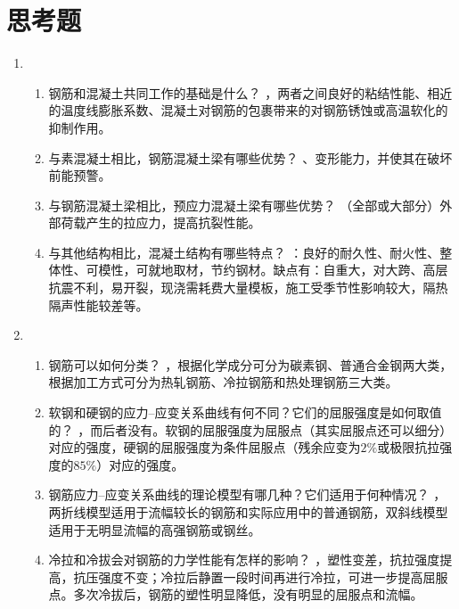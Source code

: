 \documentclass{article}
\begin{document}
\section{思考题}
\begin{enumerate}
    \item
          \begin{enumerate}[1.]
              \item 钢筋和混凝土共同工作的基础是什么？
                    ，两者之间良好的粘结性能、相近的温度线膨胀系数、混凝土对钢筋的包裹带来的对钢筋锈蚀或高温软化的抑制作用。
              \item 与素混凝土相比，钢筋混凝土梁有哪些优势？
                    、变形能力，并使其在破坏前能预警。
              \item 与钢筋混凝土梁相比，预应力混凝土梁有哪些优势？
                    （全部或大部分）外部荷载产生的拉应力，提高抗裂性能。
              \item 与其他结构相比，混凝土结构有哪些特点？
                    ：良好的耐久性、耐火性、整体性、可模性，可就地取材，节约钢材。缺点有：自重大，对大跨、高层抗震不利，易开裂，现浇需耗费大量模板，施工受季节性影响较大，隔热隔声性能较差等。
          \end{enumerate}
    \item \begin{enumerate}[1.]
              \item 钢筋可以如何分类？
                    ，根据化学成分可分为碳素钢、普通合金钢两大类，根据加工方式可分为热轧钢筋、冷拉钢筋和热处理钢筋三大类。
              \item 软钢和硬钢的应力--应变关系曲线有何不同？它们的屈服强度是如何取值的？
                    ，而后者没有。软钢的屈服强度为屈服点（其实屈服点还可以细分）对应的强度，硬钢的屈服强度为条件屈服点（残余应变为$2\%$或极限抗拉强度的$85\%$）对应的强度。
              \item 钢筋应力--应变关系曲线的理论模型有哪几种？它们适用于何种情况？
                    ，两折线模型适用于流幅较长的钢筋和实际应用中的普通钢筋，双斜线模型适用于无明显流幅的高强钢筋或钢丝。
              \item 冷拉和冷拔会对钢筋的力学性能有怎样的影响？
                    ，塑性变差，抗拉强度提高，抗压强度不变；冷拉后静置一段时间再进行冷拉，可进一步提高屈服点。多次冷拔后，钢筋的塑性明显降低，没有明显的屈服点和流幅。

\end{enumerate}
\end{enumerate}
\end{document}

